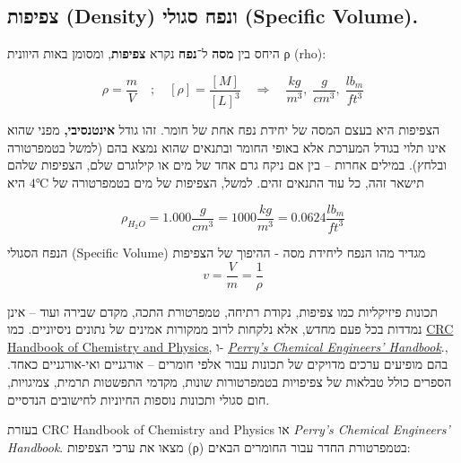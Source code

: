 \documentclass[
  hebrew,
  letterpaper,
  DIV=11,
  numbers=noendperiod]{scrreprt}
\begin{document}
\subsection{\texorpdfstring{{צפיפות} {}(Density) {ונפח סגולי} (Specific
Volume){.}}{צפיפות (Density) ונפח סגולי (Specific Volume).}}\label{ux5e6ux5e4ux5d9ux5e4ux5d5ux5ea-density-ux5d5ux5e0ux5e4ux5d7-ux5e1ux5d2ux5d5ux5dcux5d9-specific-volume.}

היחס בין \textbf{מסה} ל־\textbf{נפח} נקרא \textbf{צפיפות}, ומסומן באות
היוונית ρ (rho):

\[
\rho = \frac{m}{V} \quad ; \quad [\rho] = \frac{[M]}{[L]^3} \quad \Longrightarrow \quad \frac{kg}{m^3}, \; \frac{g}{cm^3}, \; \frac{lb_m}{ft^3}
\]

{הצפיפות היא בעצם המסה של יחידת נפח אחת של חומר. זהו גודל
\textbf{אינטנסיבי,} מפני שהוא אינו תלוי בגודל המערכת אלא באופי החומר
ובתנאים שהוא נמצא בהם (למשל בטמפרטורה ובלחץ)}. {במילים אחרות -- בין אם
ניקח גרם אחד של מים או קילוגרם שלם, הצפיפות שלהם תישאר זהה, כל עוד
התנאים זהים}. {למשל, הצפיפות של מים בטמפרטורה של} \(4℃\) {היא}

\[\rho_{H_{2}O} = 1.000\frac{g}{cm^{3}} = 1000\frac{kg}{m^{3}} = 0.0624\frac{lb_{m}}{ft^{3}}\]

{הנפח הסגולי} (Specific Volume) {מגדיר מהו הנפח ליחידת מסה - ההיפוך של
הצפיפות} \[v = \frac{V}{m} = \frac{1}{\rho}\]

{תכונות פיזיקליות כמו צפיפות}, {נקודת רתיחה}, {טמפרטורת התכה}, {מקדם
שבירה ועוד -- אינן נמדדות בכל פעם מחדש, אלא נלקחות לרוב ממקורות אמינים
של נתונים ניסיוניים}. {כמו}
\href{https://hbcp-chemnetbase-com.bengurionu.idm.oclc.org/contents/ContentsSearch.xhtml?dswid=-9306}{{CRC
Handbook of Chemistry and Physics,}} {ו-}
\href{https://primo.bgu.ac.il/discovery/fulldisplay?docid=alma990020411320204361&context=L&vid=972BGU_INST:972BGU&lang=he&search_scope=MyInst_and_CI&adaptor=Local\%20Search\%20Engine&tab=Everything&query=any,contains,Perry\%E2\%80\%99s\%20Chemical\%20Engineers\%E2\%80\%99\%20Handbook&facet=tlevel,include,online_resources&mode=basic&offset=0}{{\emph{Perry's
Chemical Engineers' Handbook}}}.{, בהם מופיעים ערכים מדויקים של תכונות
עבור אלפי חומרים -- אורגניים ואי-אורגניים כאחד. הספרים כולל טבלאות של
צפיפויות בטמפרטורות שונות, מקדמי התפשטות תרמית, צמיגויות, חום סגולי
ותכונות נוספות החיוניות לחישובים הנדסיים}. {}

{בעזרת} CRC Handbook of Chemistry and Physics {או} \emph{Perry's
Chemical Engineers' Handbook}{. מצאו את ערכי הצפיפות (}ρ{) בטמפרטורת
החדר עבור החומרים הבאים:}
\end{document}
